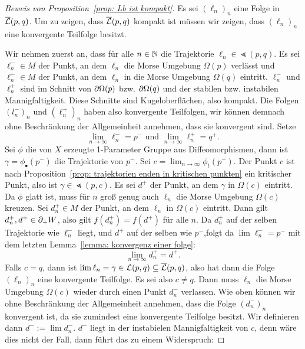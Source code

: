 \begin{proof}[Beweis von Proposition~\ref{prop: Lb ist kompakt}]
    Es sei $(\ell_n)_n$ eine Folge in ${\overline{\mathcal{L}} } (p, q)$. Um zu zeigen, dass ${\overline{\mathcal{L}} } (p, q)$ kompakt ist
    müssen wir zeigen, dass $(\ell_n)_n$ eine konvergente Teilfolge besitzt.

    Wir nehmen zuerst an, dass für alle $n \in { \mathbb N }$ die Trajektorie $\ell_n \in \Lt (p, q)$.
    Es sei $\ell_n^- \in M$ der Punkt, an dem $\ell_n$ die Morse Umgebung $\Omega(p)$ verlässt 
    und $\ell_n^- \in M$ der Punkt, an dem $\ell_n$ in die Morse Umgebung $\Omega(q)$ eintritt.
    $\ell_n^-$ und $\ell_n^+$ sind im Schnitt von ${ \partial } \Omega (p)$ bzw. ${ \partial } \Omega (q)$ und 
    der stabilen bzw. instabilen Mannigfaltigkeit. Diese Schnitte sind Kugeloberflächen, also 
    kompakt. Die Folgen $(l_n^-)_n$ und $(\ell_n^+)_n$ haben also konvergente Teilfolgen, wir können 
    demnach ohne Beschränkung der Allgemeinheit annehmen, dass sie konvergent sind. Setze
    \[ \lim_{n \to \infty} \ell_n^- = p^- \text{ und } \lim_{n \to \infty} \ell_n^+ = q^+ . \]
    Sei $\phi$ die von $X$ erzeugte 1-Parameter Gruppe aus Diffeomorphismen, dann ist 
    $\gamma = \phi_{\bullet}(p^-)$ die Trajektorie von $p^-$. Sei 
    $c = \lim_{n \to \infty} \phi_t(p^-)$. Der Punkt $c$ ist nach 
    Proposition~\ref{prop: trajektorien enden in kritischen punkten} ein kritischer Punkt,
    also ist $\gamma \in \Lt (p, c)$.  Es sei $d^+$ der Punkt, an dem $\gamma$ in $\Omega (c)$ 
    eintritt. Da $\phi$ glatt ist, muss für $n$ groß genug auch $\ell_n$ die Morse Umgebung 
    $\Omega (c)$ kreuzen. Sei $d_n^+ \in M$ der Punkt, an dem $\ell_n$ in $\Omega (c)$ eintritt. 
    Dann gilt $d_n^+, d^+ \in { \partial }_+ W$, also gilt $f(d_n^+) = f(d^+)$ für alle $n$. Da $d_n^+$ auf 
    der selben Trajektorie wie $\ell_n^-$ liegt, und $d^+$ auf der selben wie $p^-$,folgt da 
    $\lim \ell_n^- = p^-$ mit dem letzten Lemma~\ref{lemma: konvergenz einer folge}: 
    \[ \lim_{n \to \infty} d_n^+ = d^+ . \]
    Falls $c = q$, dann ist $\lim \ell_n = \gamma \in { \mathcal{L} } (p, q) \subseteq {\overline{\mathcal{L}} } (p, q)$, also hat 
    dann die Folge $(\ell_n)_n$ eine konvergente Teilfolge. Es sei also $c \neq q$. Dann muss 
    $\ell_n$ die Morse Umgebung $\Omega (c)$ wieder durch einen Punkt $d_n^-$ verlassen. Wie oben 
    können wir ohne Beschränkung der Allgemeinheit annehmen, dass die Folge $(d_n^-)_n$ konvergent 
    ist, da sie zumindest eine konvergente Teilfolge besitzt. Wir definieren dann $d^- := \lim d_n^-$. 
    $d^-$ liegt in der instabielen Mannigfaltigkeit von $c$, denn wäre dies nicht der Fall, dann 
    führt das zu einem Widerspruch:
    

\end{proof}
